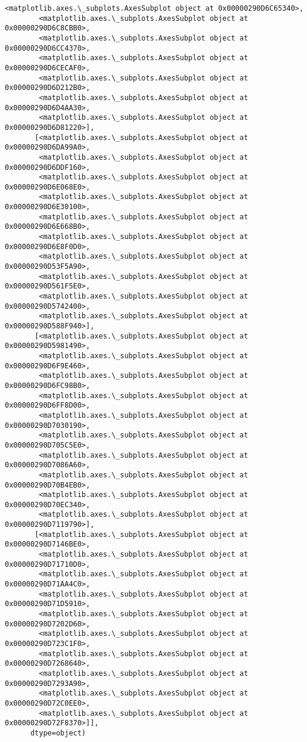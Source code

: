 \documentclass[11pt]{article}
\begin{document}
\begin{tcolorbox}[breakable, size=fbox, boxrule=.5pt, pad at break*=1mm, opacityfill=0]
\begin{Verbatim}[commandchars=\\\{\}]
        <matplotlib.axes.\_subplots.AxesSubplot object at 0x00000290D6C65340>,
        <matplotlib.axes.\_subplots.AxesSubplot object at 0x00000290D6C8CBB0>,
        <matplotlib.axes.\_subplots.AxesSubplot object at 0x00000290D6CC4370>,
        <matplotlib.axes.\_subplots.AxesSubplot object at 0x00000290D6CECAF0>,
        <matplotlib.axes.\_subplots.AxesSubplot object at 0x00000290D6D212B0>,
        <matplotlib.axes.\_subplots.AxesSubplot object at 0x00000290D6D4AA30>,
        <matplotlib.axes.\_subplots.AxesSubplot object at 0x00000290D6D81220>],
       [<matplotlib.axes.\_subplots.AxesSubplot object at 0x00000290D6DA99A0>,
        <matplotlib.axes.\_subplots.AxesSubplot object at 0x00000290D6DDF160>,
        <matplotlib.axes.\_subplots.AxesSubplot object at 0x00000290D6E068E0>,
        <matplotlib.axes.\_subplots.AxesSubplot object at 0x00000290D6E30100>,
        <matplotlib.axes.\_subplots.AxesSubplot object at 0x00000290D6E668B0>,
        <matplotlib.axes.\_subplots.AxesSubplot object at 0x00000290D6E8F0D0>,
        <matplotlib.axes.\_subplots.AxesSubplot object at 0x00000290D53F5A90>,
        <matplotlib.axes.\_subplots.AxesSubplot object at 0x00000290D561F5E0>,
        <matplotlib.axes.\_subplots.AxesSubplot object at 0x00000290D5742400>,
        <matplotlib.axes.\_subplots.AxesSubplot object at 0x00000290D588F940>],
       [<matplotlib.axes.\_subplots.AxesSubplot object at 0x00000290D5981490>,
        <matplotlib.axes.\_subplots.AxesSubplot object at 0x00000290D6F9E460>,
        <matplotlib.axes.\_subplots.AxesSubplot object at 0x00000290D6FC98B0>,
        <matplotlib.axes.\_subplots.AxesSubplot object at 0x00000290D6FF8D00>,
        <matplotlib.axes.\_subplots.AxesSubplot object at 0x00000290D7030190>,
        <matplotlib.axes.\_subplots.AxesSubplot object at 0x00000290D705C5E0>,
        <matplotlib.axes.\_subplots.AxesSubplot object at 0x00000290D7086A60>,
        <matplotlib.axes.\_subplots.AxesSubplot object at 0x00000290D70B4EB0>,
        <matplotlib.axes.\_subplots.AxesSubplot object at 0x00000290D70EC340>,
        <matplotlib.axes.\_subplots.AxesSubplot object at 0x00000290D7119790>],
       [<matplotlib.axes.\_subplots.AxesSubplot object at 0x00000290D7146BE0>,
        <matplotlib.axes.\_subplots.AxesSubplot object at 0x00000290D71710D0>,
        <matplotlib.axes.\_subplots.AxesSubplot object at 0x00000290D71AA4C0>,
        <matplotlib.axes.\_subplots.AxesSubplot object at 0x00000290D71D5910>,
        <matplotlib.axes.\_subplots.AxesSubplot object at 0x00000290D7202D60>,
        <matplotlib.axes.\_subplots.AxesSubplot object at 0x00000290D723C1F0>,
        <matplotlib.axes.\_subplots.AxesSubplot object at 0x00000290D7268640>,
        <matplotlib.axes.\_subplots.AxesSubplot object at 0x00000290D7293A90>,
        <matplotlib.axes.\_subplots.AxesSubplot object at 0x00000290D72C0EE0>,
        <matplotlib.axes.\_subplots.AxesSubplot object at 0x00000290D72F8370>]],
      dtype=object)
\end{Verbatim}
\end{tcolorbox}
        
\end{document}
